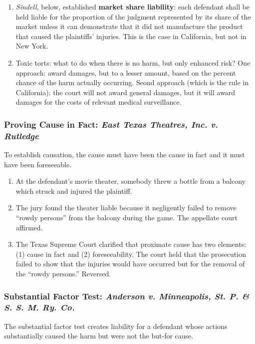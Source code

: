 \begin{enumerate}
    \item \emph{Sindell}, below, established \textbf{market share liability}: 
    each defendant shall be held liable for the proportion of the judgment 
    represented by its share of the market unless it can demonstrate that it 
    did not manufacture the product that caused the plaintiffs' injuries. This 
    is the case in California, but not in New York.
    \item Toxic torts: what to do when there is no harm, but only enhanced 
    risk? One approach: award damages, but to a lesser amount, based on the 
    percent chance of the harm actually occurring. Seond approach (which is 
    the rule in California): the court will not award general damages, but it 
    will award damages for the costs of relevant medical surveillance.
\end{enumerate}

\subsubsection{Proving Cause in Fact: \emph{East Texas Theatres, Inc. v. Rutledge}}

To establish causation, the cause must have been the cause in fact and it must 
have been foreseeable.

\begin{enumerate}
    \item At the defendant's movie theater, somebody threw a bottle from a 
    balcony which struck and injured the plaintiff.
    \item The jury found the theater liable because it negligently failed to 
    remove ``rowdy persons'' from the balcony during the game. The appellate 
    court affirmed.
    \item The Texas Supreme Court clarified that proximate cause has two 
    elements: (1) cause in fact and (2) foreseeability. The court held that 
    the prosecution failed to show that the injuries would have occurred but 
    for the removal of the ``rowdy persons.'' Reversed.
\end{enumerate}

\subsubsection{Substantial Factor Test: \emph{Anderson v. Minneapolis, St. P. \& S. S. M. Ry. Co.}}

The substantial factor test creates liability for a defendant whose actions 
substantially caused the harm but were not the but-for cause.

